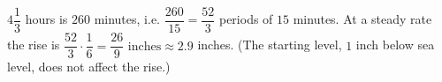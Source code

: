 $4\dfrac{1}{3}$ hours is $260$ minutes, i.e. $\dfrac{260}{15}=\dfrac{52}{3}$ periods of $15$ minutes. At a steady rate the rise is $\dfrac{52}{3}\cdot\dfrac{1}{6}=\boxed{\dfrac{26}{9}\text{ inches}}\approx2.9$ inches. (The starting level, $1$ inch below sea level, does not affect the rise.)

